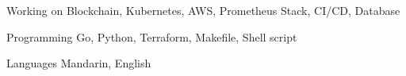 

\begin{cvskills}

  \cvskill
    {Working on} %
    {Blockchain, Kubernetes, AWS, Prometheus Stack, CI/CD, Database} %

  \cvskill
    {Programming} %
    {Go, Python, Terraform, Makefile, Shell script} %

  \cvskill
    {Languages} %
    {Mandarin, English} %

\end{cvskills}
